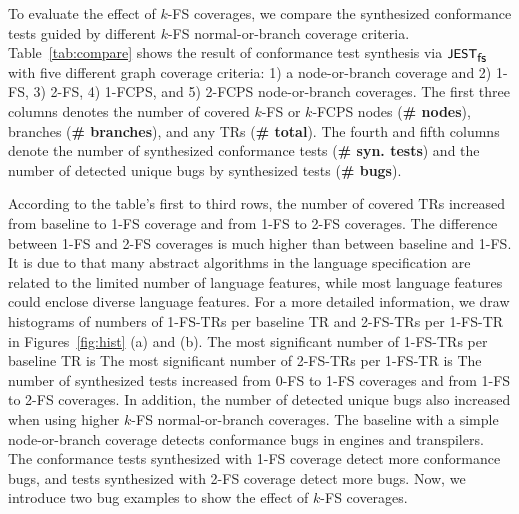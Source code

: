 To evaluate the effect of $k$-FS coverages, we compare the synthesized
conformance tests guided by different $k$-FS normal-or-branch coverage criteria.
%
Table~\ref{tab:compare} shows the result of conformance test synthesis via
$\textsf{\small JEST}_{\textsf{\small fs}}$ with five different graph coverage criteria: 1) a node-or-branch
coverage and 2) 1-FS, 3) 2-FS, 4) 1-FCPS, and 5) 2-FCPS node-or-branch
coverages.
%
The first three columns denotes the number of covered $k$-FS or $k$-FCPS nodes
(\textbf{\# nodes}), branches (\textbf{\# branches}), and any TRs (\textbf{\#
total}).
%
The fourth and fifth columns denote the number of synthesized conformance tests
(\textbf{\# syn. tests}) and the number of detected unique bugs by synthesized
tests (\textbf{\# bugs}).


According to the table's first to third rows, the number of covered
TRs increased  from baseline to 1-FS coverage and
 from 1-FS to 2-FS coverages.
%
The difference between 1-FS and 2-FS coverages is much higher than between
baseline and 1-FS.
%
It is due to that many abstract algorithms in the language specification are
related to the limited number of language features, while most language features
could enclose diverse language features.
%
For a more detailed information, we draw histograms of numbers of 1-FS-TRs per
baseline TR and 2-FS-TRs per 1-FS-TR in Figures~\ref{fig:hist} (a) and (b).
%
The most significant number of 1-FS-TRs per baseline TR is 
%
The most significant number of 2-FS-TRs per 1-FS-TR is 
%
The number of synthesized tests increased  from
0-FS to 1-FS coverages and  from 1-FS to 2-FS
coverages.
%
In addition, the number of detected unique bugs also increased when using higher
$k$-FS normal-or-branch coverages.
%
The baseline with a simple node-or-branch coverage detects 
conformance bugs in engines and transpilers.
%
The conformance tests synthesized with 1-FS coverage detect 
more conformance bugs, and tests synthesized with 2-FS coverage detect  more bugs.
%
Now, we introduce two bug examples to show the effect of $k$-FS coverages.


